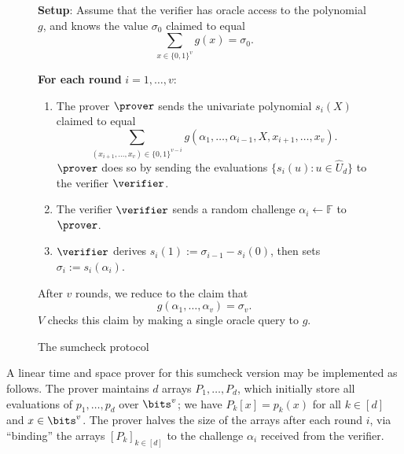 \begin{figure}[H]
\centering
\caption{The sumcheck protocol}
\label{fig:sumcheck}
\vspace{-1em}
\begin{mdframed}[linewidth=1pt,roundcorner=8pt,backgroundcolor=gray!2,innerleftmargin=10pt,innerrightmargin=10pt]
\textbf{Setup}: Assume that the verifier has oracle access to the polynomial $g$, and knows the value $\sigma_0$ claimed to equal
\[
\sum_{x\in\{0,1\}^v} g(x) = \sigma_0.
\]

\textbf{For each round} $i = 1, \ldots, v$:
\begin{enumerate}
    \item The prover $\prover$ sends the univariate polynomial $s_i(X)$ claimed to equal
    \[
    \sum_{(x_{i+1},\ldots,x_v)\in\{0,1\}^{v-i}} g(\alpha_1,\ldots,\alpha_{i-1}, X, x_{i+1},\ldots,x_v).
    \]
    $\prover$ does so by sending the evaluations $\{ s_i(u) : u \in \widehat{U}_d \}$ to the verifier $\verifier$.
    \item The verifier $\verifier$ sends a random challenge $\alpha_i \leftarrow \mathbb{F}$ to $\prover$.
    \item $\verifier$ derives $s_i(1) := \sigma_{i-1} - s_i(0)$, then sets $\sigma_i := s_i(\alpha_i)$.
\end{enumerate}

After $v$ rounds, we reduce to the claim that
\[
g(\alpha_1, \ldots, \alpha_v) = \sigma_v.
\]
$V$ checks this claim by making a single oracle query to $g$.
\end{mdframed}
\end{figure}

A linear time and space prover for this sumcheck version may be implemented as follows. The prover maintains $d$ arrays $P_1, \dotsc, P_d$, which initially store all evaluations of $p_1, \dotsc, p_d$ over $\bits^v$; we have $P_k[x] = p_k(x)$ for all $k \in [d]$ and $x \in \bits^v$. The prover halves the size of the arrays after each round $i$, via “binding” the arrays $[P_k]_{k\in [d]}$ to the challenge $\alpha_i$ received from the verifier.

